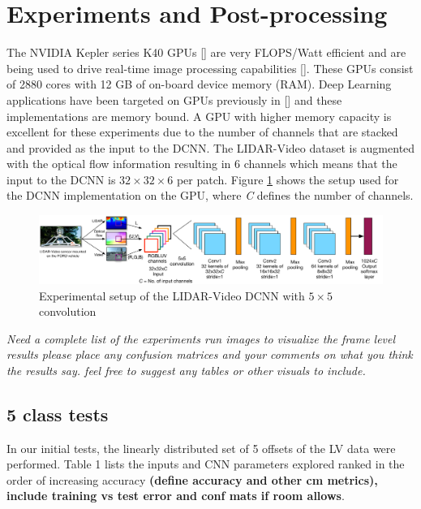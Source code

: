 \documentclass{article}
\begin{document}


\section{Experiments and Post-processing} %
\label{sec:experiments_and_post_processing}

The NVIDIA Kepler series K40 GPUs [\cite{NVIDIA-Inc.2012NVIDIAs-Ne}] are very FLOPS/Watt efficient and are being used to drive real-time image processing capabilities [\cite{Venugopal2013Accelerati}]. These GPUs consist of 2880 cores with 12 GB of on-board device memory (RAM). Deep Learning applications have been targeted on GPUs previously in [\cite{Krizhevsky2012Imagenet-C}] and these implementations are memory bound. A GPU with higher memory capacity is excellent for these experiments due to the number of channels that are stacked and provided as the input to the DCNN. The LIDAR-Video dataset is augmented with the optical flow information resulting in 6 channels which means that the input to the DCNN is $32\times32\times6$ per patch. Figure \ref{fig:Figures_lidar_dcnn_setup1} shows the setup used for the DCNN implementation on the GPU, where \emph{C} defines the number of channels.

\begin{figure}[htbp]
    \centering
        \includegraphics[scale=0.35]{Figures/lidar_dcnn_setup1.pdf}
    \caption{Experimental setup of the LIDAR-Video DCNN with $5\times5$ convolution}
    \label{fig:Figures_lidar_dcnn_setup1}
\end{figure}

\textit{Need a complete list of the experiments run
images to visualize the frame level results
please place any confusion matrices and your comments on what you think the results say.
feel free to suggest any tables or other visuals to include.}




\subsection{5 class tests} %
\label{sub:5_class_tests}
In our initial tests, the linearly distributed set of 5 offsets of the LV data were performed. Table 1 lists the inputs and CNN parameters explored ranked in the order of increasing accuracy \textbf{(define accuracy and other cm metrics), include training vs test error and conf mats if room allows}.  
\end{document}
